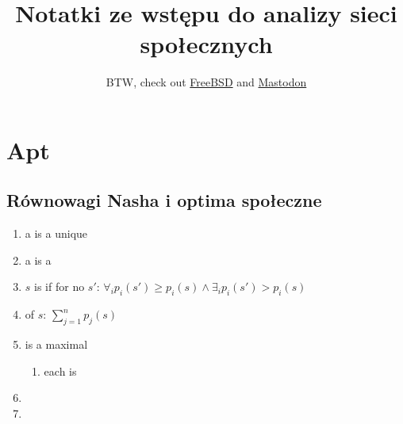 \documentclass{article}
\newcommand\wassterm[1]{{\color{blue}{#1}}}
\begin{document}
\title{Notatki ze wstępu do analizy sieci społecznych}
\author{BTW, check out \href{https://freebsd.org}{FreeBSD} and \href{https://joinmastodon.org}{Mastodon}}

\maketitle

\begin{abstract}
\end{abstract}

\section{Apt}

\subsection{Równowagi Nasha i optima społeczne}

\begin{enumerate}

  \item a 
    \wassterm{strictly dominant strategy}
    is a unique 
    \wassterm{Nash equilibrium}

  \item
    a 
    \wassterm{dominant strategy}
    is a 
    \wassterm{Nash equilibrium}

  \item
    $s$ is 
    \wassterm{Pareto efficient} 
    if for no $s'$: 
    $
    \forall_i p_i(s') \geq p_i(s) 
    \wedge
    \exists_i p_i(s') > p_i(s) 
    $

  \item
    \wassterm{social welfare} 
    of $s$: $\sum^n_{j=1}p_j(s)$

  \item
    \wassterm{social optimum} 
    is a maximal
    \wassterm{social welfare} 

    \begin{enumerate}
      \item
        each 
        \wassterm{social optimum} 
        is 
        \wassterm{Pareto efficient}
    \end{enumerate}

  \item
    \wassterm{public goods game}

  \item
    \wassterm{tragedy of the commons}

\end{enumerate}
\end{document}
